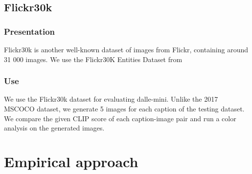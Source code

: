 \documentclass{article}
\begin{document}
\begin{multicols}{2}
\subsection{Flickr30k}

\subsubsection{Presentation}

Flickr30k is another well-known dataset of images from Flickr, containing around 31 000 images.
We use the Flickr30K Entities Dataset from \cite{flickrentitiesijcv}

\subsubsection{Use}

We use the Flickr30k dataset for evaluating dalle-mini. Unlike the 2017 MSCOCO dataset, we generate 5 images for each caption of the testing dataset.
We compare the given CLIP score of each caption-image pair and run a color analysis on the generated images.

\end{multicols}

\section{Empirical approach}
\end{document}
